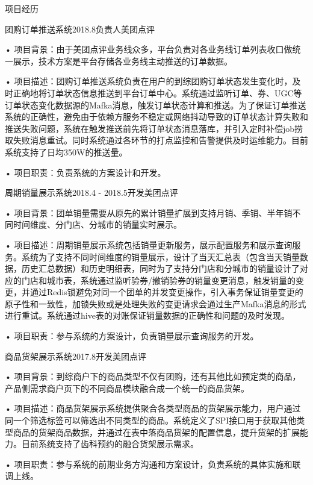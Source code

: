 \documentclass{resume} %
\begin{document}
\begin{rSection}{项目经历}

\begin{rSubsection}{团购订单推送系统}{2018.8}{负责人}{美团点评}
\item[•]项目背景：由于美团点评业务线众多，平台负责对各业务线订单列表收口做统一展示，技术方案是平台存储各业务线主动推送的订单数据。
\item[•]项目描述：团购订单推送系统负责在用户的到综团购订单状态发生变化时，及时正确地将订单状态信息推送到平台订单中心。系统通过监听订单、券、UGC等订单状态变化数据源的Mafka消息，触发订单状态计算和推送。为了保证订单推送系统的正确性，避免由于依赖方服务不稳定或网络抖动导致的订单状态计算失败和推送失败问题，系统在触发推送前先将订单状态消息落库，并引入定时补偿job捞取失败消息重试。同时系统通过各环节的打点监控和告警提供及时运维能力。目前系统支持了日均350W的推送量。
\item[•]项目职责：负责系统的方案设计和开发。
\end{rSubsection}


\begin{rSubsection}{周期销量展示系统}{2018.4 - 2018.5}{开发}{美团点评}
\item[•]项目背景：团单销量需要从原先的累计销量扩展到支持月销、季销、半年销不同时间维度、分门店、分城市的销量实时展示。
\item[•]项目描述：周期销量展示系统包括销量更新服务，展示配置服务和展示查询服务。系统为了支持不同时间维度的销量展示，设计了当天汇总表（包含当天销量数据，历史汇总数据）和历史明细表，同时为了支持分门店和分城市的销量设计了对应的门店和城市表，系统通过监听验券/撤销验券的销量变更消息，触发销量的变更，并通过Redis锁避免对同一个团单的并发变更操作，引入事务保证销量变更的原子性和一致性，加锁失败或是处理失败的变更请求会通过生产Mafka消息的形式进行重试。系统通过hive表的对账保证销量数据的正确性和问题的及时发现。
\item[•]项目职责：参与系统的方案设计，负责销量展示查询服务的开发。
\end{rSubsection}


\begin{rSubsection}{商品货架展示系统}{2017.8}{开发}{美团点评}
\item[•]项目背景：到综商户下的商品类型不仅有团购，还有其他比如预定类的商品，产品侧需求商户页下的不同商品模块融合成一个统一的商品货架。
\item[•]项目描述：商品货架展示系统提供聚合各类型商品的货架展示能力，用户通过同一个筛选标签可以筛选出不同类型的商品。系统定义了SPI接口用于获取其他类型商品的货架商品数据，并通过在表中落商品货架的配置信息，提升货架的扩展能力。目前系统支持了齿科预约的融合货架展示需求。
\item[•]项目职责：参与系统的前期业务方沟通和方案设计，负责系统的具体实施和联调上线。
\end{rSubsection}

\end{rSection}
\end{document}
